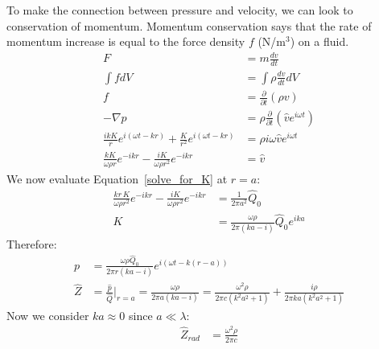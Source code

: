\documentclass[10pt,letterpaper]{article}
\begin{document}
%


To make the connection between pressure and velocity, we can look to conservation of momentum. Momentum conservation says that the rate of momentum increase is equal to the force density $f$ (N/m$^3$) on a fluid.
\begin{align}
F&=m\frac{dv}{dt}\\
\int f dV &= \int \rho \frac{dv}{dt} dV\\
f&=\frac{\partial}{\partial t} (\rho v) \\
-\nabla p &= \rho \frac{\partial}{\partial t}\left( \hat{v}e^{i\omega t } \right)\\
\frac{ikK}{r} e^{i(\omega t - k r)} + \frac{K}{r^2} e^{i(\omega t - k r)} &=\rho i\omega \hat{v}e^{i\omega t}\\
\frac{kK}{\omega \rho r} e^{-ikr} - \frac{iK}{\omega \rho r^2} e^{-ikr} &= \hat{v}\label{solve_for_K}
\end{align}
We now evaluate Equation~\ref{solve_for_K} at $r=a$:
\begin{align}
\frac{kr\,K}{\omega \rho r^2} e^{-ikr} - \frac{iK}{\omega \rho r^2} e^{-ikr} &= \frac{1}{2\pi a^2} \hat{Q}_0\\
K &= \frac{\omega\rho}{2\pi({ka-i})} \hat{Q}_0e^{ika}
\end{align}
Therefore:
\begin{align}
p&=\frac{\omega\rho \hat{Q}_0}{2\pi r(ka-i)} e^{i(\omega t - k (r-a))}\\
\hat{Z}&=\frac{\hat{p}}{\hat{Q}}|_{r=a}=\frac{\omega \rho}{2\pi a(ka-i)}=\frac{\omega^2 \rho }{2\pi c(k^2a^2+1)}+\frac{i \rho }{2\pi ka(k^2a^2+1)}
\end{align}
Now we consider $ka\approx0$ since $a \ll \lambda$:
\begin{align}
\hat{Z}_{rad}&=\frac{\omega^2 \rho }{2\pi c}
\end{align}
\end{document}
